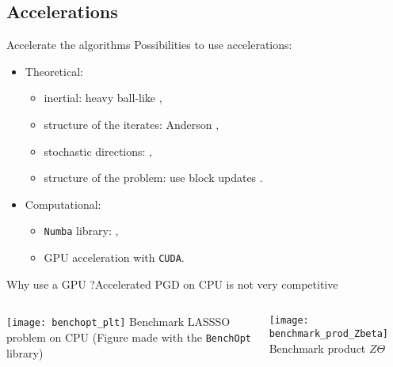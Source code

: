 \documentclass[10pt,aspectratio=43]{beamer}
\begin{document}
\subsection{Accelerations}
\begin{frame}{Accelerate the algorithms}
Possibilities to use accelerations:
\begin{itemize}
    \setlength\itemsep{1em}
    \item Theoretical:
    \begin{itemize}
        \item inertial: heavy ball-like \citep{nesterov27method},
        \item structure of the iterates: Anderson \citep{bertrand2021anderson},
        \item stochastic directions: \citep{nesterov2012efficiency},
        \item structure of the problem: use block updates \citep{Beck17}.
    \end{itemize}
    \item Computational:
    \begin{itemize}
        \item \texttt{Numba} library: \citep{lam2015numba},
        \item GPU acceleration with \texttt{CUDA}.
    \end{itemize}
\end{itemize}
\end{frame}

\begin{frame}[fragile]{Why use a GPU ?}{Accelerated PGD on CPU is not very competitive}
    \begin{columns}
        \begin{column}{0.55\textwidth}
            \centering
            \texttt{[image: benchopt\_plt]}
           \hfill Benchmark LASSSO problem on CPU (Figure made with
           the \texttt{BenchOpt} library)
        \end{column}
        \pause
        \begin{column}{0.55\textwidth}
            \centering
            \texttt{[image: benchmark\_prod\_Zbeta]}
            \hfill Benchmark product $Z\Theta$
        \end{column}
    \end{columns}
    \medskip
{}
\end{frame}
\end{document}
